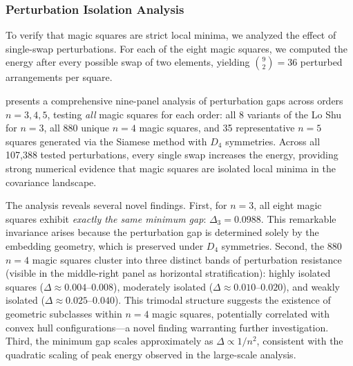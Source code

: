 \subsubsection{Perturbation Isolation Analysis}

To verify that magic squares are strict local minima, we analyzed the effect of single-swap perturbations.
For each of the eight magic squares, we computed the energy after every possible swap 
of two elements, yielding $\binom{9}{2} = 36$ perturbed arrangements per square.

 presents a comprehensive nine-panel analysis of perturbation gaps
across orders $n=3,4,5$, testing \emph{all} magic squares for each order:
all 8 variants of the Lo Shu for $n=3$, all 880 unique $n=4$ magic squares,
and 35 representative $n=5$ squares generated via the Siamese method with $D_4$ symmetries.
Across all 107,388 tested perturbations, every single swap increases the energy,
providing strong numerical evidence that magic squares are isolated local minima in the covariance landscape.

The analysis reveals several novel findings.
First, for $n=3$, all eight magic squares exhibit \emph{exactly the same minimum gap}:
$\Delta_3 = 0.0988$.
This remarkable invariance arises because the perturbation gap is determined solely 
by the embedding geometry, which is preserved under $D_4$ symmetries.
Second, the 880 $n=4$ magic squares cluster into three distinct bands of perturbation resistance
(visible in the middle-right panel as horizontal stratification):
highly isolated squares ($\Delta \approx 0.004$--$0.008$),
moderately isolated ($\Delta \approx 0.010$--$0.020$), 
and weakly isolated ($\Delta \approx 0.025$--$0.040$).
This trimodal structure suggests the existence of geometric subclasses within $n=4$ magic squares,
potentially correlated with convex hull configurations---a novel finding warranting further investigation.
Third, the minimum gap scales approximately as $\Delta \propto 1/n^2$,
consistent with the quadratic scaling of peak energy observed in the large-scale analysis.

